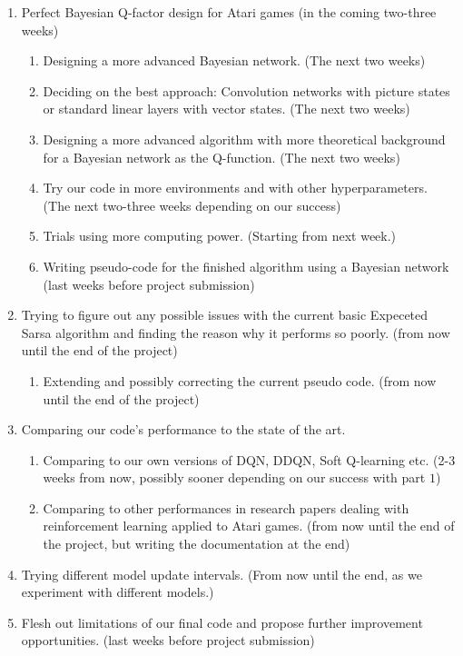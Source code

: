 \documentclass{article}
\begin{document}
\begin{enumerate}
    \item Perfect Bayesian Q-factor design for Atari games (in the coming two-three weeks)
    \begin{enumerate}
        \item Designing a more advanced Bayesian network. (The next two weeks)
        \item Deciding on the best approach: Convolution networks with picture states or standard linear layers with vector states. (The next two weeks)
        \item Designing a more advanced algorithm with more theoretical background for a Bayesian network as the Q-function. (The next two weeks)
        \item Try our code in more environments and with other hyperparameters. (The next two-three weeks depending on our success)
        \item Trials using more computing power. (Starting from next week.)
        \item Writing pseudo-code for the finished algorithm using a Bayesian network (last weeks before project submission)
    \end{enumerate}
    \item Trying to figure out any possible issues with the current basic Expeceted Sarsa algorithm and finding the reason why it performs so poorly. (from now until the end of the project)
    \begin{enumerate}
        \item Extending and possibly correcting the current pseudo code. (from now until the end of the project)
    \end{enumerate}
    \item Comparing our code's performance to the state of the art.
    \begin{enumerate}
        \item Comparing to our own versions of DQN, DDQN, Soft Q-learning etc. (2-3 weeks from now, possibly sooner depending on our success with part $1$)
        \item Comparing to other performances in research papers dealing with reinforcement learning applied to Atari games. (from now until the end of the project, but writing the documentation at the end)
    \end{enumerate}
    \item Trying different model update intervals. (From now until the end, as we experiment with different models.)
    \item Flesh out limitations of our final code and propose further improvement opportunities. (last weeks before project submission)
\end{enumerate}
\end{document}
